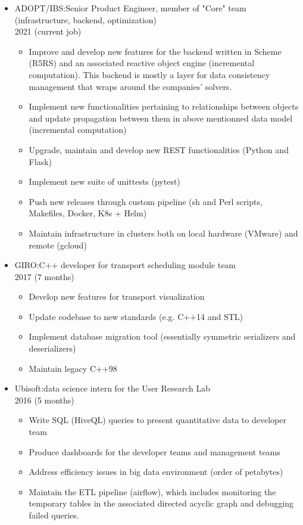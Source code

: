 \documentclass{article}
\begin{document}
\begin{itemize}
  \item ADOPT/IBS:\@ Senior Product Engineer, member of "Core" team (infrastructure, backend, optimization)\\ 2021 (current job)
    \begin{itemize}
      \item Improve and develop new features for the backend written in Scheme (R5RS) and an associated reactive object engine
        (incremental computation). This backend is mostly a layer for data consistency management that wraps around the companies' solvers.
      \item Implement new functionalities pertaining to relationships between objects
        and update propagation between them in above mentionned data model (incremental computation)
      \item Upgrade, maintain and develop new REST functionalities (Python and Flask)
      \item Implement new suite of unittests (pytest)
      \item Push new releases through custom pipeline 
        (sh and Perl scripts, Makefiles, Docker, K8s + Helm)
      \item Maintain infrastructure in clusters both on local hardware (VMware) and remote (gcloud)
    \end{itemize}

  \item GIRO:\@ C++ developer for transport scheduling module team \\ 2017 (7 months)
    \begin{itemize}
      \item Develop new features for transport visualization
      \item Update codebase to new standards (e.g. C++14 and STL)
      \item Implement database migration tool (essentially symmetric serializers and deserializers)
      \item Maintain legacy C++98
    \end{itemize}

\clearpage

  \item Ubisoft:\@ data science intern for the User Research Lab\\ 2016 (5 months)
    \begin{itemize}
      \item Write SQL (HiveQL) queries to present quantitative data to developer team
      \item Produce dashboards for the developer teams and management teams
      \item Address efficiency issues in big data environment (order of petabytes)
      \item Maintain the ETL pipeline (airflow), which includes monitoring
        the temporary tables in the associated directed acyclic graph and debugging failed queries.
    \end{itemize}


\end{itemize}
\end{document}
